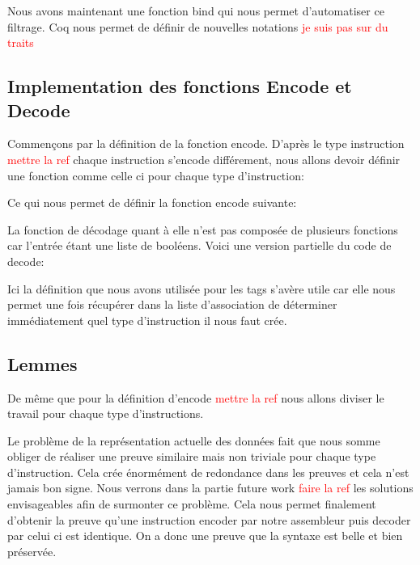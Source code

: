 \documentclass {article}
\newcommand{\codefrom}[3]
           {}
\theoremstyle{definition}
\theoremstyle{remark}
\newcommand{\todo}[1]{\textcolor{red}{#1}}
\begin{document}
\codefrom{src}{encode}{monade}

Nous avons maintenant une fonction bind qui nous permet d'automatiser ce filtrage. Coq nous permet de
définir de nouvelles notations \todo{je suis pas sur du traits}

\codefrom{src}{encode}{notation}






\subsection{Implementation des fonctions Encode et Decode}

Commençons par la définition de la fonction encode. D'après le type instruction \todo{mettre la ref}
chaque instruction s'encode différement, nous allons devoir définir une fonction comme celle ci
pour chaque type d'instruction:

\codefrom{src}{encode}{encode_t_n}

Ce qui nous permet de définir la fonction encode suivante:

\codefrom{src}{encode}{encode}

La fonction de décodage quant à elle n'est pas composée de plusieurs fonctions car l'entrée
étant une liste de booléens.
Voici une version partielle du code de decode:

\codefrom{src}{encode}{decode}

Ici la définition que nous avons utilisée pour les tags s'avère utile car elle nous permet
une fois récupérer dans la liste d'association de déterminer immédiatement quel type
d'instruction il nous faut crée.





\subsection{Lemmes}

De même que pour la définition d'encode \todo{mettre la ref} nous allons diviser le travail pour chaque
type d'instructions.

\codefrom{src}{encodeProof}{encode_decode_t_n}

Le problème de la représentation actuelle des données fait que nous somme obliger de réaliser une preuve
similaire mais non triviale pour chaque type d'instruction. Cela crée énormément de redondance dans les preuves
et cela n'est jamais bon signe. Nous verrons dans la partie future work \todo{faire la ref} les solutions envisageables afin
de surmonter ce problème.
Cela nous permet finalement d'obtenir la preuve qu'une instruction encoder par notre assembleur puis decoder par celui
ci est identique. On a donc une preuve que la syntaxe est belle et bien préservée.
\end{document}
